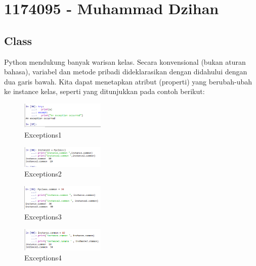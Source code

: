 \section{1174095 - Muhammad Dzihan}
\subsection{Class}
Python mendukung banyak warisan kelas. Secara konvensional (bukan aturan bahasa), variabel dan metode pribadi dideklarasikan dengan didahului dengan dua garis bawah. Kita dapat menetapkan atribut (properti) yang berubah-ubah ke instance kelas, seperti yang ditunjukkan pada contoh berikut:
\hfill\break


\hfill\break
	\begin{figure}[H]
		\centering
		\includegraphics[width=4cm]{figures/kelompok1/1/dzihan/class1.PNG}
		\caption{Exceptions1}
	\end{figure}
\hfill\break


\hfill\break
	\begin{figure}[H]
		\centering
		\includegraphics[width=4cm]{figures/kelompok1/1/dzihan/class2.PNG}
		\caption{Exceptions2}
	\end{figure}
\hfill\break


\hfill\break
	\begin{figure}[H]
		\centering
		\includegraphics[width=4cm]{figures/kelompok1/1/dzihan/class3.PNG}
		\caption{Exceptions3}
	\end{figure}
\hfill\break


\hfill\break
	\begin{figure}[H]
		\centering
		\includegraphics[width=4cm]{figures/kelompok1/1/dzihan/class4.PNG}
		\caption{Exceptions4}
	\end{figure}
\hfill\break



